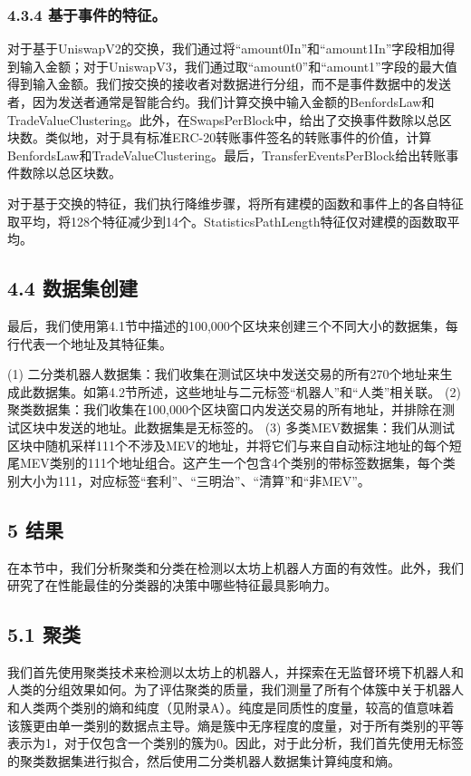 \subsubsection*{4.3.4 基于事件的特征。} 对于基于UniswapV2的交换，我们通过将“amount0In”和“amount1In”字段相加得到输入金额；对于UniswapV3，我们通过取“amount0”和“amount1”字段的最大值得到输入金额。我们按交换的接收者对数据进行分组，而不是事件数据中的发送者，因为发送者通常是智能合约。我们计算交换中输入金额的BenfordsLaw和TradeValueClustering。此外，在SwapsPerBlock中，给出了交换事件数除以总区块数。类似地，对于具有标准ERC-20转账事件签名的转账事件的价值，计算BenfordsLaw和TradeValueClustering。最后，TransferEventsPerBlock给出转账事件数除以总区块数。

对于基于交换的特征，我们执行降维步骤，将所有建模的函数和事件上的各自特征取平均，将128个特征减少到14个。StatisticsPathLength特征仅对建模的函数取平均。

\subsection*{4.4 数据集创建}

最后，我们使用第4.1节中描述的100,000个区块来创建三个不同大小的数据集，每行代表一个地址及其特征集。

(1) 二分类机器人数据集：我们收集在测试区块中发送交易的所有270个地址来生成此数据集。如第4.2节所述，这些地址与二元标签“机器人”和“人类”相关联。
(2) 聚类数据集：我们收集在100,000个区块窗口内发送交易的所有地址，并排除在测试区块中发送的地址。此数据集是无标签的。
(3) 多类MEV数据集：我们从测试区块中随机采样111个不涉及MEV的地址，并将它们与来自自动标注地址的每个短尾MEV类别的111个地址组合。这产生一个包含4个类别的带标签数据集，每个类别大小为111，对应标签“套利”、“三明治”、“清算”和“非MEV”。

\subsection*{5 结果}

在本节中，我们分析聚类和分类在检测以太坊上机器人方面的有效性。此外，我们研究了在性能最佳的分类器的决策中哪些特征最具影响力。

\subsection*{5.1 聚类}

我们首先使用聚类技术来检测以太坊上的机器人，并探索在无监督环境下机器人和人类的分组效果如何。为了评估聚类的质量，我们测量了所有个体簇中关于机器人和人类两个类别的熵和纯度（见附录A）。纯度是同质性的度量，较高的值意味着该簇更由单一类别的数据点主导。熵是簇中无序程度的度量，对于所有类别的平等表示为1，对于仅包含一个类别的簇为0。因此，对于此分析，我们首先使用无标签的聚类数据集进行拟合，然后使用二分类机器人数据集计算纯度和熵。

